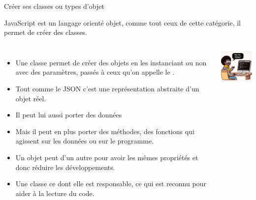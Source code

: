\documentclass{beamer}
\begin{document}
    \begin{frame}{Créer ses classes ou types d'objet}
        \begin{footnotesize}
            JavaScript est un langage orienté objet, comme tout ceux de cette catégorie, il permet de créer des classes.
            \bigbreak
            \begin{columns}
                \begin{itemize}
                    \item Une classe permet de créer des objets en les instanciant ou non avec des paramètres, passés à ceux qu'on appelle le .
                    \item Tout comme le JSON c'est une représentation abstraite d'un objet réel.
                    \item Il peut lui aussi porter des données
                    \item Mais il peut en plus porter des méthodes, des fonctions qui agissent sur les données ou sur le programme.
                    \item Un objet peut  d'un autre pour avoir les mêmes propriétés et donc réduire les développements.
                    \item Une classe  ce dont elle est responsable, ce qui est reconnu pour aider à la lecture du code.
                \end{itemize}
                \centering
                \includegraphics[width=3cm]{image/you-are-classy}
            \end{columns}
        \end{footnotesize}
    \end{frame}
\end{document}
